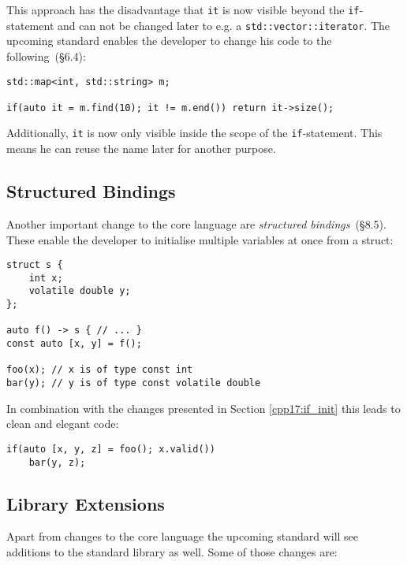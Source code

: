 \noindent This approach has the disadvantage that \texttt{it} is now visible beyond the \texttt{if}-statement and can not be changed later to e.g. a \texttt{std::vector::iterator}. The upcoming standard enables the developer to change his code to the following~\cite{cpp17std}(§6.4):

\begin{verbatim}
std::map<int, std::string> m;

if(auto it = m.find(10); it != m.end()) return it->size();
\end{verbatim}

\noindent Additionally, \texttt{it} is now only visible inside the scope of the \texttt{if}-statement. This means he can reuse the name later for another purpose.

\subsection{Structured Bindings}\label{cpp17:struct_bind}

Another important change to the core language are \textit{structured bindings}~\cite{cpp17std}(§8.5). These enable the developer to initialise multiple variables at once from a struct:

\begin{verbatim}
struct s {
    int x;
    volatile double y;
};

auto f() -> s { // ... }
const auto [x, y] = f();

foo(x); // x is of type const int
bar(y); // y is of type const volatile double
\end{verbatim}

\noindent In combination with the changes presented in Section \ref{cpp17:if_init} this leads to clean and elegant code:

\begin{verbatim}
if(auto [x, y, z] = foo(); x.valid())
    bar(y, z);
\end{verbatim}

\subsection{Library Extensions}\label{cpp17:lib_ext}

Apart from changes to the core language the upcoming standard will see additions to the standard library as well. Some of those changes are:

